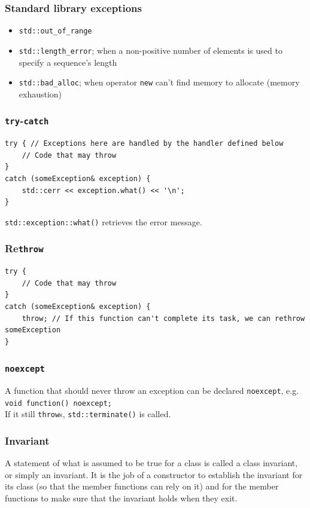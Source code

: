 \documentclass[table, xcdraw]{article}%
\begin{document}
\subsubsection{Standard library exceptions}

\begin{itemize}
    \item \texttt{std::out_of_range}
    \item \texttt{std::length_error}; when a non-positive number of elements is used to specify a sequence's length
    \item \texttt{std::bad_alloc}; when operator \texttt{new} can't find memory to allocate (memory exhaustion)
\end{itemize}

\subsubsection{\texttt{try}-\texttt{catch}}

\begin{verbatim}
try { // Exceptions here are handled by the handler defined below
    // Code that may throw
}
catch (someException& exception) {
    std::cerr << exception.what() << '\n';
}
\end{verbatim}

\texttt{std::exception::what()} retrieves the error message.

\subsubsection{Re\texttt{throw}}

\begin{verbatim}
try {
    // Code that may throw
}
catch (someException& exception) {
    throw; // If this function can't complete its task, we can rethrow someException
}
\end{verbatim}

\subsubsection{\texttt{noexcept}}
A function that should never throw an exception can be declared \texttt{noexcept}, e.g. \texttt{void function() noexcept;}\\
If it still \texttt{throw}s, \texttt{std::terminate()} is called.

\subsubsection{Invariant}
A statement of what is assumed to be true for a class is called a class invariant, or simply an invariant. It is the job of a constructor to establish the invariant for its class (so that the member functions can rely on it) and for the member functions to make sure that the invariant holds when they exit.
\end{document}
